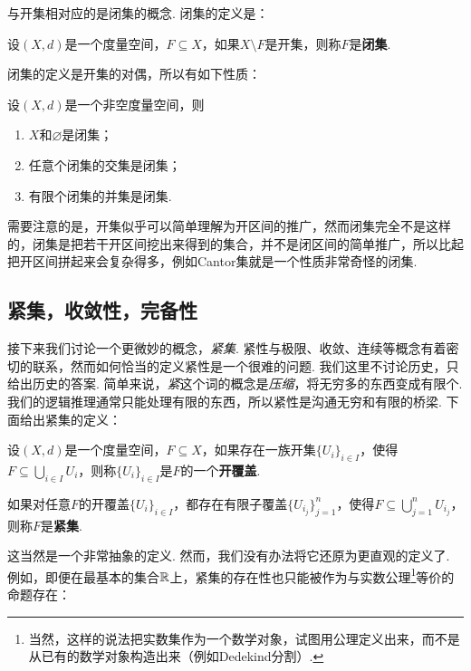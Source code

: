与开集相对应的是闭集的概念. 闭集的定义是：

\begin{definition}[闭集]
    设$(X,d)$是一个度量空间，$F\subseteq X$，如果$X\setminus F$是开集，则称$F$是\textbf{闭集}. 
\end{definition}
闭集的定义是开集的对偶，所以有如下性质：

\begin{proposition}\label{prop:closed-prop}
    设$(X,d)$是一个非空度量空间，则
    \begin{enumerate}
        \item $X$和$\varnothing$是闭集；
        \item 任意个闭集的交集是闭集；
        \item 有限个闭集的并集是闭集. 
    \end{enumerate}
\end{proposition}

需要注意的是，开集似乎可以简单理解为开区间的推广，然而闭集完全不是这样的，闭集是把若干开区间挖出来得到的集合，并不是闭区间的简单推广，所以比起把开区间拼起来会复杂得多，例如Cantor集就是一个性质非常奇怪的闭集. 

\subsection{紧集，收敛性，完备性}

接下来我们讨论一个更微妙的概念，\emph{紧集}. 紧性与极限、收敛、连续等概念有着密切的联系，然而如何恰当的定义紧性是一个很难的问题. 我们这里不讨论历史，只给出历史的答案. 简单来说，\emph{紧}这个词的概念是\emph{压缩}，将无穷多的东西变成有限个. 我们的逻辑推理通常只能处理有限的东西，所以紧性是沟通无穷和有限的桥梁. 下面给出紧集的定义：

\begin{definition}[开覆盖，紧集]
    设$(X,d)$是一个度量空间，$F\subseteq X$，如果存在一族开集$\{U_i\}_{i\in I}$，使得$F\subseteq \bigcup_{i\in I}U_i$，则称$\{U_i\}_{i\in I}$是$F$的一个\textbf{开覆盖}. 
    
    如果对任意$F$的开覆盖$\{U_i\}_{i\in I}$，都存在有限子覆盖$\{U_{i_j}\}_{j=1}^n$，使得$F\subseteq \bigcup_{j=1}^nU_{i_j}$，则称$F$是\textbf{紧集}. 
\end{definition}
这当然是一个非常抽象的定义. 然而，我们没有办法将它还原为更直观的定义了. 例如，即便在最基本的集合$\mathbb{R}$上，紧集的存在性也只能被作为与实数公理\footnote{当然，这样的说法把实数集作为一个数学对象，试图用公理定义出来，而不是从已有的数学对象构造出来（例如Dedekind分割）. }等价的命题存在：

